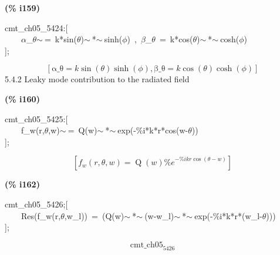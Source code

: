 \documentclass[fleqn]{article}
\begin{document}
\noindent
\begin{minipage}[t]{4.000000em}\color{red}\bfseries
(\% i159)	
\end{minipage}
\begin{minipage}[t]{\textwidth}\color{blue}
cmt\_ch05\_5424:[\\
\ \ \ \ \ensuremath{\alpha}\_\ensuremath{\theta}\ensuremath{\sim\ }=\ k*sin(\ensuremath{\theta})\ensuremath{\sim\ }*\ensuremath{\sim\ }sinh(\ensuremath{\phi})\ ,\ \ensuremath{\beta}\_\ensuremath{\theta}\ =\ k*cos(\ensuremath{\theta})\ensuremath{\sim\ }*\ensuremath{\sim\ }cosh(\ensuremath{\phi})\\
];
\end{minipage}
\[\displaystyle \tag{\% o159} 
\left[ \ensuremath{\mathrm{\alpha \_ \theta }}=k \sin{\left( \theta \right) } \sinh{\left( \phi \right) }\operatorname{,}\ensuremath{\mathrm{\beta \_ \theta }}=k \cos{\left( \theta \right) } \cosh{\left( \phi \right) }\right] \mbox{}
\]
5.4.2 Leaky mode contribution to the radiated field


\noindent
\begin{minipage}[t]{4.000000em}\color{red}\bfseries
(\% i160)	
\end{minipage}
\begin{minipage}[t]{\textwidth}\color{blue}
cmt\_ch05\_5425:[\\
\ \ \ \ f\_w(r,\ensuremath{\theta},w)\ensuremath{\sim\ }=\ Q(w)\ensuremath{\sim\ }*\ensuremath{\sim\ }exp(-\%i*k*r*cos(w-\ensuremath{\theta}))\\
];
\end{minipage}
\[\displaystyle \tag{\% o160} 
\left[ {f_w}\left( r\operatorname{,}\theta \operatorname{,}w\right) =\operatorname{Q}(w) {{\% e}^{-\% i k r \cos{\left( \theta -w\right) }}}\right] \mbox{}
\]


\noindent
\begin{minipage}[t]{4.000000em}\color{red}\bfseries
(\% i162)	
\end{minipage}
\begin{minipage}[t]{\textwidth}\color{blue}
cmt\_ch05\_5426;[\\
\ \ \ \ Res(f\_w(r,\ensuremath{\theta},w\_l))\ =\ (Q(w)\ensuremath{\sim\ }*\ensuremath{\sim\ }(w-w\_l)\ensuremath{\sim\ }*\ensuremath{\sim\ }exp(-\%i*k*r*(w\_l-\ensuremath{\theta})))\ \\
];
\end{minipage}
\[\displaystyle \tag{\% o161} 
{{\ensuremath{\mathrm{cmt\_ ch05}}}_{\ensuremath{\mathrm{5426}}}}\mbox{}\]
\end{document}
